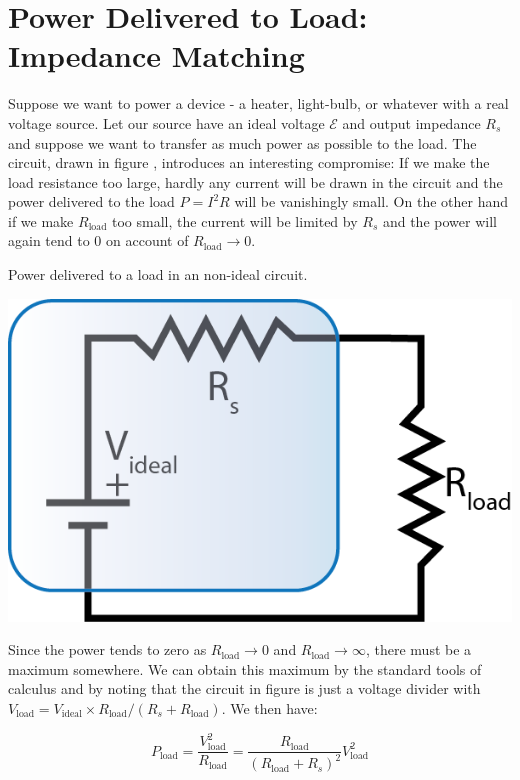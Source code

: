 \documentclass{tufte-book}
\begin{document}
\section{Power Delivered to Load: Impedance Matching}
Suppose we want to power a device - a heater, light-bulb, or whatever with a real voltage source. Let our source have an ideal voltage $\mathcal{E}$ and output impedance $R_s$ and suppose we want to transfer as much power as possible to the load. The circuit, drawn in figure \label{fig:loadresistor}, introduces an interesting compromise: If we make the load resistance too large, hardly any current will be drawn in the circuit and the power delivered to the load $P = I^2R$ will be vanishingly small. On the other hand if we make $R_\text{load}$ too small, the current will be limited by $R_s$ and the power will again tend to 0 on account of $R_\text{load}\rightarrow 0$.

\begin{marginfigure}
\caption{Power delivered to a load in an non-ideal circuit.}
\label{fig:loadresistor}
\includegraphics{loadresistor}
\end{marginfigure}

Since the power tends to zero as $R_\text{load}\rightarrow 0$ and $R_\text{load}\rightarrow \infty$, there must be a maximum somewhere. We can obtain this maximum by the standard tools of calculus and by noting that the circuit in figure \label{fig:loadresistor} is just a voltage divider with $V_\text{load} = V_\text{ideal}\times R_\text{load}/(R_s+R_\text{load})$. We then have:

\begin{equation}\label{eq:maxpow1}
P_\text{load} = \frac{V_\text{load}^2}{R_\text{load}} = \frac{R_\text{load}}{\left(R_\text{load}+R_s\right)^2}V_\text{load}^2
\end{equation}
\end{document}
